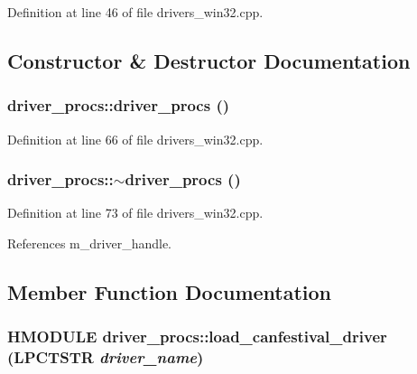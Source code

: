 Definition at line 46 of file drivers\_\-win32.cpp.

\subsection{Constructor \& Destructor Documentation}
\hypertarget{classdriver__procs_8e3bbe4106667c3c671d24819febd053}{
\subsubsection[driver\_\-procs]{\setlength{\rightskip}{0pt plus 5cm}driver\_\-procs::driver\_\-procs ()}}
\label{classdriver__procs_8e3bbe4106667c3c671d24819febd053}




Definition at line 66 of file drivers\_\-win32.cpp.\hypertarget{classdriver__procs_1abda1ff5fd6c82a3549fad6437ac0f7}{
\subsubsection[$\sim$driver\_\-procs]{\setlength{\rightskip}{0pt plus 5cm}driver\_\-procs::$\sim$driver\_\-procs ()}}
\label{classdriver__procs_1abda1ff5fd6c82a3549fad6437ac0f7}




Definition at line 73 of file drivers\_\-win32.cpp.

References m\_\-driver\_\-handle.

\subsection{Member Function Documentation}
\hypertarget{classdriver__procs_719fa10d86bcd9b7a1ab7bea3dec1d03}{
\subsubsection[load\_\-canfestival\_\-driver]{\setlength{\rightskip}{0pt plus 5cm}HMODULE driver\_\-procs::load\_\-canfestival\_\-driver (LPCTSTR {\em driver\_\-name})}}
\label{classdriver__procs_719fa10d86bcd9b7a1ab7bea3dec1d03}




